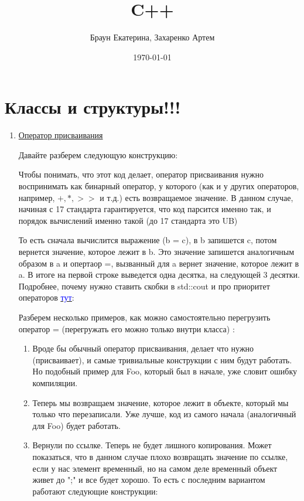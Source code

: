 \documentclass[a5paper]{article}
\title{C++}
\author{Браун Екатерина, Захаренко Артем}
\date{\today}
\begin{document}
\maketitle

\section{Классы и структуры!!!}
\begin{enumerate}
    
    \item \underline{Оператор присваивания}
    \par \quad Давайте разберем следующую конструкцию:
    
    Чтобы понимать, что этот код делает, оператор присваивания нужно воспринимать как бинарный оператор, у которого (как и у других операторов, например, $+, *, >>$ и т.д.) есть возвращаемое значение. В данном случае, начиная с 17 стандарта гарантируется, что код парсится именно так, и порядок вычислений именно такой (до 17 стандарта это UB)
    
    \par \quad То есть сначала вычислится выражение (b = c), в b запишется c, потом вернется значение, которое лежит в b. Это значение запишется аналогичным образом в a и опертаор =, вызванный для a вернет значение, которое лежит в a. В итоге на первой строке выведется одна десятка, на следующей 3 десятки. Подробнее, почему нужно ставить скобки в std::cout и про приоритет операторов \href{https://en.cppreference.com/w/cpp/language/operator_precedence}{\underline{\textcolor{blue}{тут}}}:
    \par \quad Разберем несколько примеров, как можно самостоятельно перегрузить оператор = (перегружать его можно только внутри класса) :
    
    
    
    

    \begin{enumerate}
        \item Вроде бы обычный оператор присваивания, делает что нужно (присваивает), и самые тривиальные конструкции с ним будут работать. Но подобный пример для Foo, который был в начале, уже словит ошибку компиляции.
        \item Теперь мы возвращаем значение, которое лежит в объекте, который мы только что перезаписали. Уже лучше, код из самого начала (аналогичный для Foo) будет работать.
        \item Вернули по ссылке. Теперь не будет лишного копирования. Может показаться, что в данном случае плохо возвращать значение по ссылке, если у нас элемент временный, но на самом деле временный объект живет до ";" и все будет хорошо. То есть с последним вариантом работают следующие конструкции: \newpage
        
    \end{enumerate}


\end{enumerate}
\end{document}
